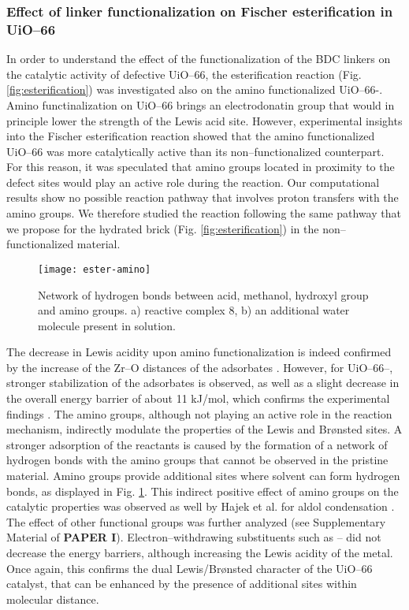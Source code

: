 \subsubsection*{Effect of linker functionalization on Fischer esterification in UiO--66}
In order to understand the effect of the functionalization of the BDC linkers on the catalytic activity of defective UiO--66, the esterification reaction (Fig. \ref{fig:esterification}) was investigated also on the amino functionalized UiO--66-. Amino functinalization on UiO--66 brings an electrodonatin group that would in principle lower the strength of the Lewis acid site. However, experimental insights into the Fischer esterification reaction showed that the amino functionalized UiO--66 was more catalytically active than its non--functionalized counterpart. For this reason, it was speculated that amino groups located in proximity to the defect sites would play an active role during the reaction. Our computational results show no possible reaction pathway that involves proton transfers with the amino groups. We therefore studied the reaction following the same pathway that we propose for the hydrated brick (Fig. \ref{fig:esterification}) in the non--functionalized material. 
\npar
\begin{figure}[!htbp]
	\centering
	\texttt{[image: ester-amino]}
	\caption{Network of hydrogen bonds between acid, methanol, hydroxyl group and amino groups. a) reactive complex 8, b) an additional water molecule present in solution.}
	\label{fig:ester-amino}
\end{figure}
The decrease in Lewis acidity upon amino functionalization is indeed confirmed by the increase of the Zr--O distances of the adsorbates \cite{vermoortele2012electronic}. However, for UiO--66--, stronger stabilization of the adsorbates is observed, as well as a slight decrease in the overall energy barrier of about 11 kJ/mol, which confirms the experimental findings \cite{cirujano2015conversion, cirujano2015zirconium}. The amino groups, although not playing an active role in the reaction mechanism, indirectly modulate the properties of the Lewis and Br\o{}nsted sites. A stronger adsorption of the reactants is caused by the formation of a network of hydrogen bonds with the amino groups that cannot be observed in the pristine material. Amino groups provide additional sites where solvent can form hydrogen bonds, as displayed in Fig. \ref{fig:ester-amino}. This indirect positive effect of amino groups on the catalytic properties was observed as well by Hajek et al. for aldol condensation \cite{vandichel2015active}. The effect of other functional groups was further analyzed (see Supplementary Material of \textbf{PAPER I}). Electron--withdrawing substituents such as -- did not decrease the energy barriers, although increasing the Lewis acidity of the metal. Once again, this confirms the dual Lewis/Br\o{}nsted character of the UiO--66 catalyst, that can be enhanced by the presence of additional sites within molecular distance. 



